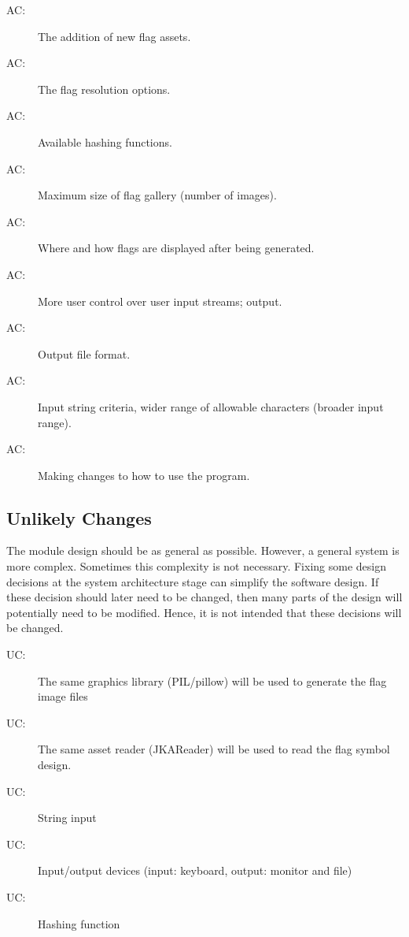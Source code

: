 \documentclass[12pt, titlepage]{article}
\newcounter{acnum}
\newcommand{\actheacnum}{AC\theacnum}
\newcounter{ucnum}
\newcommand{\uctheucnum}{UC\theucnum}
\begin{document}
\begin{description}
\item[ \actheacnum \label{ac1}:] The addition of new flag assets.
\item[ \actheacnum \label{ac2}:] The flag resolution options.
\item[ \actheacnum \label{ac3}:] Available hashing functions.
\item[ \actheacnum \label{ac4}:] Maximum size of flag gallery (number of images).
\item[ \actheacnum \label{ac5}:] Where and how flags are displayed after being generated.
\item[ \actheacnum \label{ac6}:] More user control over user input streams; output.
\item[ \actheacnum \label{ac7}:] Output file format.
\item[ \actheacnum \label{ac8}:] Input string criteria, wider range of allowable characters (broader input range).
\item[ \actheacnum \label{ac9}:] Making changes to how to use the program.

\end{description}

\subsection{Unlikely Changes} \label{SecUchange}

The module design should be as general as possible. However, a general system is
more complex. Sometimes this complexity is not necessary. Fixing some design
decisions at the system architecture stage can simplify the software design. If
these decision should later need to be changed, then many parts of the design
will potentially need to be modified. Hence, it is not intended that these
decisions will be changed.

\begin{description}
\item[ \uctheucnum \label{uc1}:] The same graphics library (PIL/pillow) will be used to generate the flag image files 
\item[ \uctheucnum \label{uc2}:] The same asset reader (JKAReader) will be used to read the flag symbol design.
\item[ \uctheucnum \label{uc3}:] String input 
\item[ \uctheucnum \label{uc4}:] Input/output devices (input: keyboard, output: monitor and file)
\item[ \uctheucnum \label{uc5}:] Hashing function  
\end{description}
\end{document}
